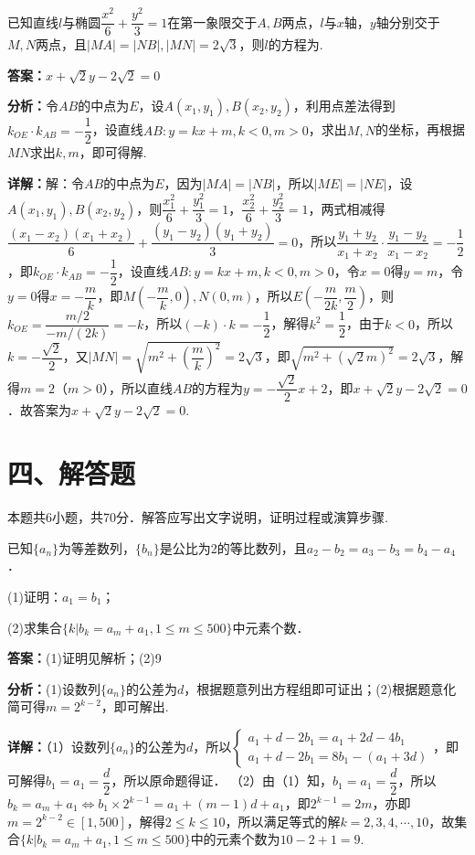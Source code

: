 \begin{question}[points=5]
已知直线$l$与椭圆$\dfrac{x^2}{6}+\dfrac{y^2}{3}=1$在第一象限交于$A,B$两点，$l$与$x$轴，$y$轴分别交于$M,N$两点，且$|MA|=|NB|,|MN|=2\sqrt{3}$，则$l$的方程为.
\fillin[{$x+\sqrt{2}y-2\sqrt{2}=0$}]
\begin{solution}
\textbf{答案：}$x+\sqrt{2}y-2\sqrt{2}=0$

\textbf{分析：}令$AB$的中点为$E$，设$A(x_1,y_1),B(x_2,y_2)$，利用点差法得到$k_{OE}\cdot k_{AB}=-\dfrac{1}{2}$，设直线$AB:y=kx+m,k<0,m>0$，求出$M,N$的坐标，再根据$MN$求出$k,m$，即可得解.

\textbf{详解：}解：令$AB$的中点为$E$，因为$|MA|=|NB|$，所以$|ME|=|NE|$，设$A(x_1,y_1),B(x_2,y_2)$，则$\dfrac{x_1^2}{6}+\dfrac{y_1^2}{3}=1$，$\dfrac{x_2^2}{6}+\dfrac{y_2^2}{3}=1$，两式相减得$\dfrac{(x_1-x_2)(x_1+x_2)}{6}+\dfrac{(y_1-y_2)(y_1+y_2)}{3}=0$，所以$\dfrac{y_1+y_2}{x_1+x_2}\cdot\dfrac{y_1-y_2}{x_1-x_2}=-\dfrac{1}{2}$，即$k_{OE}\cdot k_{AB}=-\dfrac{1}{2}$，设直线$AB:y=kx+m,k<0,m>0$，令$x=0$得$y=m$，令$y=0$得$x=-\dfrac{m}{k}$，即$M\left(-\dfrac{m}{k},0\right),N(0,m)$，所以$E\left(-\dfrac{m}{2k},\dfrac{m}{2}\right)$，则$k_{OE}=\dfrac{m/2}{-m/(2k)}=-k$，所以$(-k)\cdot k=-\dfrac{1}{2}$，解得$k^2=\dfrac{1}{2}$，由于$k<0$，所以$k=-\dfrac{\sqrt{2}}{2}$，又$|MN|=\sqrt{m^2+\left(\dfrac{m}{k}\right)^2}=2\sqrt{3}$，即$\sqrt{m^2+(\sqrt{2}m)^2}=2\sqrt{3}$，解得$m=2$（$m>0$），所以直线$AB$的方程为$y=-\dfrac{\sqrt{2}}{2}x+2$，即$x+\sqrt{2}y-2\sqrt{2}=0$．故答案为$x+\sqrt{2}y-2\sqrt{2}=0$.
\end{solution}
\end{question}

\section*{四、解答题}
本题共6小题，共70分．解答应写出文字说明，证明过程或演算步骤.

\begin{question}[points=10]
已知$\{a_n\}$为等差数列，$\{b_n\}$是公比为2的等比数列，且$a_2-b_2=a_3-b_3=b_4-a_4$．

(1)证明：$a_1=b_1$；

(2)求集合$\{k|b_k=a_m+a_1,1\leq m\leq 500\}$中元素个数．
\begin{solution}
\textbf{答案：}(1)证明见解析；(2)9

\textbf{分析：}(1)设数列$\{a_n\}$的公差为$d$，根据题意列出方程组即可证出；(2)根据题意化简可得$m=2^{k-2}$，即可解出.

\textbf{详解：}（1）设数列$\{a_n\}$的公差为$d$，所以$\begin{cases} a_1+d-2b_1=a_1+2d-4b_1 \\ a_1+d-2b_1=8b_1-(a_1+3d) \end{cases}$，即可解得$b_1=a_1=\dfrac{d}{2}$，所以原命题得证．
（2）由（1）知，$b_1=a_1=\dfrac{d}{2}$，所以$b_k=a_m+a_1\Leftrightarrow b_1\times 2^{k-1}=a_1+(m-1)d+a_1$，即$2^{k-1}=2m$，亦即$m=2^{k-2}\in[1,500]$，解得$2\leq k\leq 10$，所以满足等式的解$k=2,3,4,\cdots,10$，故集合$\{k|b_k=a_m+a_1,1\leq m\leq 500\}$中的元素个数为$10-2+1=9$.
\end{solution}
\end{question}


